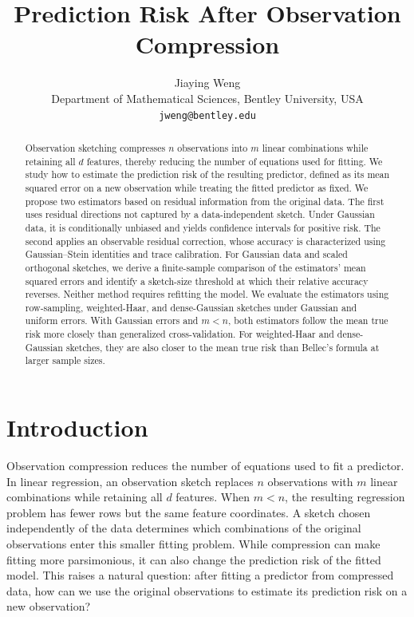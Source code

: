 \documentclass{article}
\title{Prediction Risk After Observation Compression}
\author{Jiaying Weng \\
Department of Mathematical Sciences, Bentley University, USA \\
\texttt{jweng@bentley.edu}}
\theoremstyle{plain} %
\theoremstyle{definition} %
\theoremstyle{definition} %
\begin{document}
\maketitle

\begin{abstract}
Observation sketching compresses \(n\) observations into \(m\) linear combinations while retaining all \(d\) features, thereby reducing the number of equations used for fitting. We study how to estimate the prediction risk of the resulting predictor, defined as its mean squared error on a new observation while treating the fitted predictor as fixed. We propose two estimators based on residual information from the original data. The first uses residual directions not captured by a data-independent sketch. Under Gaussian data, it is conditionally unbiased and yields confidence intervals for positive risk. The second applies an observable residual correction, whose accuracy is characterized using Gaussian--Stein identities and trace calibration. For Gaussian data and scaled orthogonal sketches, we derive a finite-sample comparison of the estimators' mean squared errors and identify a sketch-size threshold at which their relative accuracy reverses. Neither method requires refitting the model. We evaluate the estimators using row-sampling, weighted-Haar, and dense-Gaussian sketches under Gaussian and uniform errors. With Gaussian errors and \(m<n\), both estimators follow the mean true risk more closely than generalized cross-validation. For weighted-Haar and dense-Gaussian sketches, they are also closer to the mean true risk than Bellec's formula at larger sample sizes.
\end{abstract}

\section{Introduction}
\label{sec:intro}

Observation compression reduces the number of equations used to fit a predictor. In linear regression, an observation sketch replaces $n$ observations with $m$ linear combinations while retaining all $d$ features. When $m<n$, the resulting regression problem has fewer rows but the same feature coordinates. A sketch chosen independently of the data determines which combinations of the original observations enter this smaller fitting problem. While compression can make fitting more parsimonious, it can also change the prediction risk of the fitted model. This raises a natural question: after fitting a predictor from compressed data, how can we use the original observations to estimate its prediction risk on a new observation?
\end{document}
